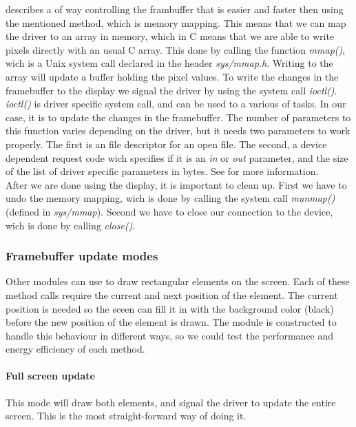 \cite[section 5.4.2]{compendium} describes a of way controlling the frambuffer that is easier and faster then using the mentioned method, which is memory mapping. This means that we can map the driver to an array in memory, which in C means that we are able to write pixels directly with an usual C array. This done by calling the function \emph{mmap()}, wich is a Unix system call declared in the header \emph{sys/mmap.h}. 
Writing to the array will update a buffer holding the pixel values. To write the changes in the framebuffer to the display we signal the driver by using the system call \emph{ioctl()}. \\

\emph{ioctl()} is driver specific system call, and can be used to a various of tasks. In our case, it is to update the changes in the framebuffer. The number of parameters to this function varies depending on the driver, but it needs two parameters to work properly. The first is an file descriptor for an open file. The second, a device dependent request code wich specifies if it is an \emph{in} or \emph{out} parameter, and the size of the list of driver specific parameters in bytes. See \cite[ioctl]{linux_programmers_manual} for more information.   
\\

After we are done using the display, it is important to clean up. First we have to undo the memory mapping, wich is done by calling the system call \emph{munmap()} (defined in \emph{sys/mmap}). Second we have to close our connection to the device, wich is done by calling \emph{close()}.

\subsubsection{Framebuffer update modes}
\label{subsubsection:framebuffer-update-modes}
Other modules can use  to draw rectangular elements on the screen. Each of these method calls require the current and next position of the element. The current position is needed so the sceen can fill it in with the background color (black) before the new position of the element is drawn. The module is constructed to handle this behaviour in different ways, so we could test the performance and energy efficiency of each method.

\paragraph{Full screen update}
This mode will draw both elements, and signal the driver to update the entire screen. This is the most straight-forward way of doing it.

